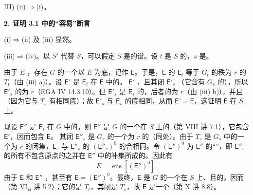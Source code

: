 III) (ii)$\Rightarrow$(i)。

\textbf{2. 证明 3.1 中的“容易”断言}

(i)$\Rightarrow$(ii) 及 (iii) 显然。

(iii)$\Rightarrow$(iv)。以 $S'$ 代替 $S$，可以假定 $S$ 是的谱。设 $t$ 是 $S$ 的，$s$ 是。

由于 $E$ ，存在 $G$ 的一个以 $E$ 为底，记作 $\mathsf E$。于是，$\mathsf E$ 的 $\mathsf E_t$ 等于 $G_t$ 的秩为 $r$ 的 $T_t$（由 (iii) a)）。设 $\mathsf E'$ 是 $\mathsf E_t$ 在 $\mathsf E$ 中的。 $\mathsf E'$ ，且其闭 $\mathsf E'_s$ （它含有 $G_s$ 的），所以 $\mathsf E'_s$ 的为 $r$（EGA IV 14.3.10）。但 $\mathsf E'_s$ 是 $\mathsf E_s$ 的，后者的为 $r$（由 (iii) b)），并且（因为它与 $T_s$ 有相同底）；故 $\mathsf E'_s$ 与 $\mathsf E_s$ 的底相同，从而 $\mathsf E'=\mathsf E$，这证明 $\mathsf E$ 在 $S$ 上。

现设 $\mathsf E''$ 是 $\mathsf E_t$ 在 $G$ 中的。则 $\mathsf E''$ 是 $G$ 的一个在 $S$ 上的（第 VIII 讲 7.1），它包含 $\mathsf E'$，因而包含 $\mathsf E$。
其闭 $\mathsf E''_s$ 是 $G_s$ 的一个为 $r$ 的（同处）。由于 $T_s$ 是 $G_s$ 中的一个为 $r$ 的闭集，$\mathsf E_s$ 与 $\mathsf E''_s$ 的 $(\mathsf E''_s)^0$ 的合相同。令 $(\mathsf E'')^0$ 为 $\mathsf E''$ 的“”，即 $\mathsf E''_s$ 的所有不包含原点的之并在 $\mathsf E''$ 中的补集所成的。因此有
\[E=\operatorname{ens}[(\mathsf E'')^0].\]
由于 $\mathsf E$ 和 $\mathsf E''$ ，甚至有 $\mathsf E=(\mathsf E'')^0$。最终，$\mathsf E$ 是 $G$ 的一个在 $S$ 上、且的，因而（第 VI$_B$ 讲 5.2）；它的是 $T_t$，其闭是 $T_s$，故 $\mathsf E$ 是一个（第 X 讲 8.8）。

